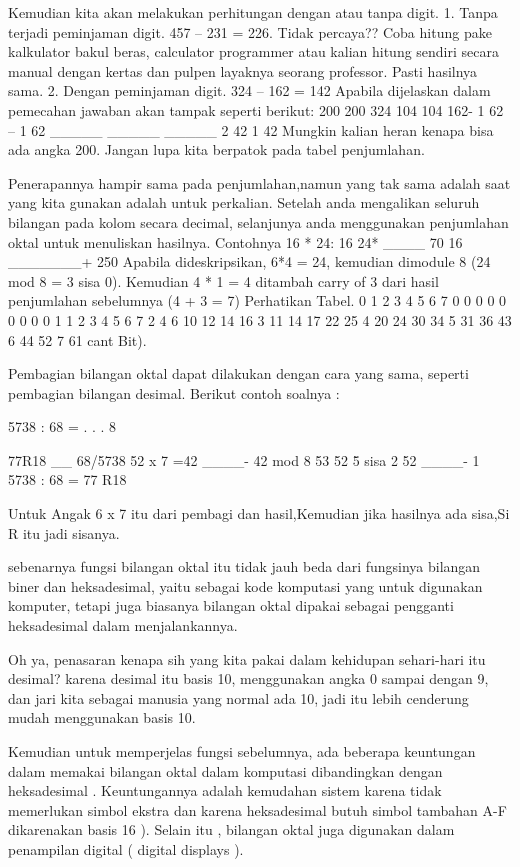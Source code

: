 Kemudian kita akan melakukan perhitungan dengan atau tanpa digit.  
1.	Tanpa terjadi peminjaman digit.
457 – 231 = 226. Tidak percaya?? Coba hitung pake kalkulator bakul beras, calculator programmer atau kalian hitung sendiri secara manual dengan kertas dan pulpen layaknya seorang professor. Pasti hasilnya sama.
2.	Dengan peminjaman digit.
324 – 162 = 142
Apabila dijelaskan dalam pemecahan jawaban akan tampak seperti berikut:
                                200                                         200
324                           104                                          104
162-                       1  62 –                                    1   62
_____                   _____                                   _____
    2                              42                                       1   42
Mungkin kalian heran kenapa bisa ada angka 200. Jangan lupa kita berpatok pada tabel penjumlahan.
	
Penerapannya hampir sama pada penjumlahan,namun yang tak sama adalah saat yang kita gunakan adalah untuk perkalian. Setelah anda mengalikan seluruh bilangan pada kolom secara decimal, selanjunya anda menggunakan penjumlahan oktal untuk menuliskan hasilnya.
Contohnya 16 * 24:
16
24*
____
                70
             16
            _______+
            250
Apabila dideskripsikan, 6*4 = 24, kemudian dimodule 8 (24 mod 8 = 3 sisa 0). Kemudian 4 * 1 = 4 ditambah carry of 3 dari hasil penjumlahan sebelumnya (4 + 3 = 7)
Perhatikan Tabel.
0	1	2	3	4	5	6	7
0	0	0	0	0	0	0	0	0
1	1	2	3	4	5	6	7
2	4	6	10	12	14	16
3	11	14	17	22	25
4	20	24	30	34
5	31	36	43
6	44	52
7	61
cant Bit).

Pembagian bilangan oktal dapat dilakukan dengan cara yang sama, seperti pembagian bilangan desimal.
Berikut contoh soalnya :
	
5738 :  68 = . . . 8	
	 
	   77R18
	   __
	68/5738
	   52		\-\- x 7 =42
	   ____-	42 mod 8
	    53
	    52		\-\-\> \= 5 sisa 2 52
	   ____-
	   	 1
5738 : 68 = 77 R18

Untuk Angak 6 x 7 itu dari pembagi dan hasil,Kemudian jika hasilnya ada sisa,Si R itu jadi sisanya.


sebenarnya fungsi bilangan oktal itu tidak jauh beda dari fungsinya bilangan biner dan heksadesimal, yaitu sebagai kode komputasi yang untuk digunakan komputer, tetapi juga biasanya bilangan oktal dipakai sebagai pengganti heksadesimal dalam menjalankannya.

Oh ya, penasaran kenapa sih yang kita pakai dalam kehidupan sehari-hari itu desimal? karena desimal itu basis 10, menggunakan angka 0 sampai dengan 9, dan jari kita sebagai manusia yang normal ada 10, jadi itu lebih cenderung  mudah menggunakan basis 10.

Kemudian  untuk memperjelas fungsi sebelumnya, ada beberapa keuntungan dalam memakai bilangan oktal dalam komputasi dibandingkan dengan heksadesimal . Keuntungannya adalah kemudahan sistem karena tidak memerlukan simbol ekstra dan karena heksadesimal butuh simbol tambahan A-F dikarenakan basis 16 ). Selain itu , bilangan oktal juga digunakan dalam penampilan digital ( digital displays ).
